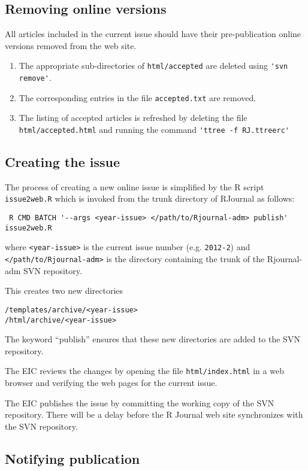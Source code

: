 \documentclass[11pt]{article}
\begin{document}
\subsection{Removing online versions}

All articles included in the current issue should have their 
pre-publication online versions removed from the web site. 
\begin{enumerate}
\item The appropriate sub-directories of \verb+html/accepted+ are
  deleted using \verb+'svn remove'+.
\item The corresponding entries in the file \texttt{accepted.txt} are 
  removed.
\item The listing of accepted articles is refreshed by deleting the
  file \texttt{html/accepted.html} and running the command
  \verb+'ttree -f RJ.ttreerc'+
\end{enumerate}

\subsection{Creating the issue}

The process of creating a new online issue is simplified by the
R script \texttt{issue2web.R} which is invoked from the trunk
directory of RJournal as follows:
\begin{verbatim}
 R CMD BATCH '--args <year-issue> </path/to/Rjournal-adm> publish' issue2web.R
\end{verbatim}
where \verb+<year-issue>+ is the current issue number
(e.g. \texttt{2012-2}) and \verb+</path/to/Rjournal-adm>+ is the
directory containing the trunk of the Rjournal-adm SVN repository. 

This creates two new directories
\begin{verbatim}
/templates/archive/<year-issue>
/html/archive/<year-issue>
\end{verbatim}
The keyword ``publish'' ensures that these new directories are
added to the SVN repository.

The EIC reviews the changes by opening the file
\texttt{html/index.html} in a web browser and verifying the web
pages for the current issue.

The EIC publishes the issue by committing the working copy of the SVN
repository. There will be a delay before the R Journal web site
synchronizes with the SVN repository.

\subsection{Notifying publication}
\end{document}
